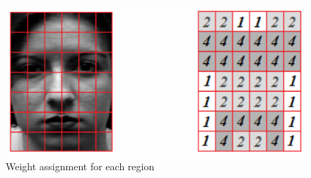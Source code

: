 \begin{figure}[!h]
\begin{center}
\noindent \includegraphics[scale=0.4]{figures/lbp_region_weight} 
\newline
\caption{Weight assignment for each region}
\label{lbp_region_weight}
\end{center} 
\end{figure}
